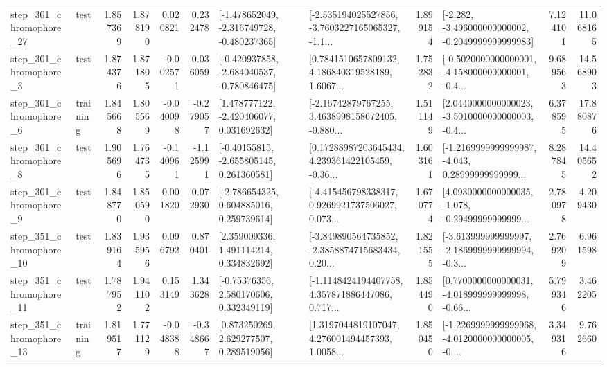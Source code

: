 \begin{tabular}{llrrrrllrlrr}
  step\_301\_chromophore\_27 &      test &      1.857369 &    1.878190 &      0.020821 &  0.232478 &  [-1.478652049, -2.316749728, -0.480237365] &  [-2.535194025527856, -3.7603227165065327, -1.1... &       1.899154 &  [-2.282, -3.496000000000002, -0.2049999999999983] &            7.124101 &         11.068165 \\
   step\_301\_chromophore\_3 &      test &      1.874376 &    1.871805 &     -0.002571 &  0.036059 &  [-0.420937858, -2.684040537, -0.780846475] &  [0.7841510657809132, 4.186840319528189, 1.6067... &       1.752832 &  [-0.5020000000000001, -4.158000000000001, -0.4... &            9.689563 &         14.568903 \\
   step\_301\_chromophore\_6 &  training &      1.845668 &    1.805569 &     -0.040098 & -0.279057 &    [1.478777122, -2.420406077, 0.031692632] &  [-2.16742879767255, 3.4638998158672405, -0.880... &       1.511149 &  [2.0440000000000023, -3.5010000000000003, -0.4... &            6.378595 &         17.880876 \\
   step\_301\_chromophore\_8 &      test &      1.905696 &    1.764735 &     -0.140961 & -1.125991 &    [-0.40155815, -2.655805145, 0.261360581] &  [0.17288987203645434, 4.239361422105459, -0.36... &       1.603161 &  [-1.2169999999999987, -4.043, 0.28999999999999... &            8.287845 &         14.405652 \\
   step\_301\_chromophore\_9 &      test &      1.848770 &    1.850590 &      0.001820 &  0.072930 &    [-2.786654325, 0.604885016, 0.259739614] &  [-4.415456798338317, 0.9269921737506027, 0.073... &       1.670774 &  [4.0930000000000035, -1.078, -0.29499999999999... &            2.780978 &          4.209430 \\
  step\_351\_chromophore\_10 &      test &      1.839164 &    1.935956 &      0.096792 &  0.870401 &     [2.359009336, 1.491114214, 0.334832692] &  [-3.849890564735852, -2.3858874715683434, 0.20... &       1.821555 &  [-3.613999999999997, -2.1869999999999994, -0.3... &            2.769209 &          6.961598 \\
  step\_351\_chromophore\_11 &      test &      1.787952 &    1.941102 &      0.153149 &  1.343628 &     [-0.75376356, 2.580170606, 0.332349119] &  [-1.1148424194407758, 4.357871886447086, 0.717... &       1.854490 &  [0.7700000000000031, -4.018999999999998, -0.66... &            5.799346 &          3.462205 \\
  step\_351\_chromophore\_13 &  training &      1.819517 &    1.771129 &     -0.048388 & -0.348667 &     [0.873250269, 2.629277507, 0.289519056] &  [1.3197044819107047, 4.276001494457393, 1.0058... &       1.850450 &  [-1.2269999999999968, -4.0120000000000005, -0.... &            3.349316 &          9.762660 \\

\end{tabular}
